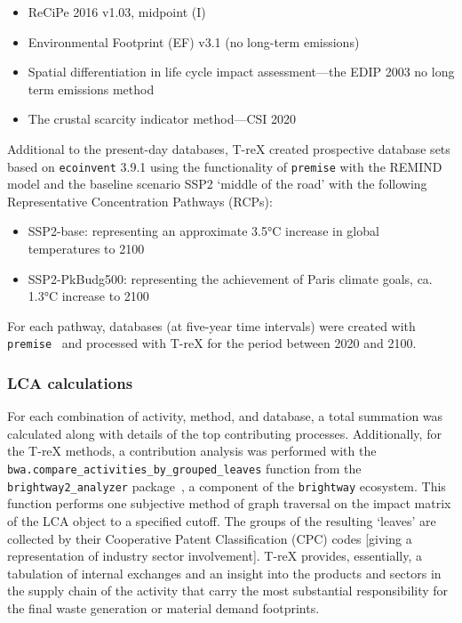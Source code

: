 \documentclass[a4paper,fleqn]{cas-dc}
\begin{document}
	\begin{itemize}
		\item ReCiPe 2016 v1.03, midpoint (I)~\citep{huijbregts2016recipe}
		\item Environmental Footprint (EF) v3.1 (no long-term emissions)~\citep{eu2023ef}
		\item Spatial differentiation in life cycle impact assessment---the EDIP 2003 no long term emissions method~\citep{hauschild2003edip}
		\item The crustal scarcity indicator method---CSI 2020~\citep{arvidsson2020csi}
	\end{itemize}
	
	Additional to the present-day databases, T-reX created prospective database
	sets based on \texttt{ecoinvent} 3.9.1 using the functionality of
	\texttt{premise} with the REMIND model and the baseline scenario SSP2 `middle
	of the road' with the following Representative Concentration Pathways (RCPs):
	\begin{itemize}
		\item SSP2-base: representing an approximate 3.5°C increase in global temperatures to
		2100
		\item SSP2-PkBudg500: representing the achievement of Paris climate goals, ca. 1.3°C
		increase to 2100
	\end{itemize}
	
	For each pathway, databases (at five-year time intervals) were created with
	\texttt{premise}~\citep{sacchi2022premise} and processed with T-reX for the
	period between 2020 and 2100.
	
	\subsubsection{LCA calculations}
	For each combination of activity, method, and database, a total summation was
	calculated along with details of the top contributing processes. Additionally,
	for the T-reX methods, a contribution analysis was performed with the
	\texttt{bwa.compare\_activities\_by\_grouped\_leaves} function from the
	\texttt{brightway2\_analyzer} package~\citep{mutel2016brightway2analyzer}, a
	component of the \texttt{brightway} ecosystem. This function performs one
	subjective method of graph traversal on the impact matrix of the LCA object to
	a specified cutoff. The groups of the resulting `leaves' are collected by their
	Cooperative Patent Classification (CPC) codes [giving a representation of
	industry sector involvement]. T-reX provides, essentially, a tabulation of
	internal exchanges and an insight into the products and sectors in the supply
	chain of the activity that carry the most substantial responsibility for the
	final waste generation or material demand footprints.
	
\end{document}
